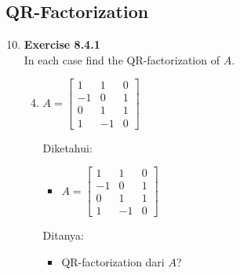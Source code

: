 \documentclass[12pt, a4paper]{scrartcl}
\begin{document}
    \subsection*{QR-Factorization}
        \begin{enumerate}
            \setcounter{enumi}{9}
            \item \textbf{Exercise 8.4.1}\\In each case find the QR-factorization of $A$.
            \begin{enumerate}
                \setcounter{enumii}{3}
                \item $A = \begin{bmatrix}
                    1 & 1 & 0\\
                    -1 & 0 & 1\\
                    0 & 1 & 1\\
                    1 & -1 & 0
                \end{bmatrix}$

                Diketahui:
                \begin{itemize}
                    \item[] $A = \begin{bmatrix}
                        1 & 1 & 0\\
                        -1 & 0 & 1\\
                        0 & 1 & 1\\
                        1 & -1 & 0
                    \end{bmatrix}$
                \end{itemize}

                Ditanya:
                \begin{itemize}
                    \item QR-factorization dari $A$?
                \end{itemize}


\end{enumerate}
\end{enumerate}
\end{document}
